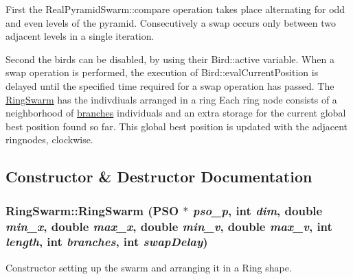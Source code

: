 First the RealPyramidSwarm::compare operation takes place alternating for odd and even levels of the pyramid. Consecutively a swap occurs only between two adjacent levels in a single iteration.\par
 Second the birds can be disabled, by using their Bird::active variable. When a swap operation is performed, the execution of Bird::evalCurrentPosition is delayed until the specified time required for a swap operation has passed. The \hyperlink{classRingSwarm}{RingSwarm} has the indivdiuals arranged in a ring Each ring node consists of a neighborhood of \hyperlink{classRingSwarm_f187d6157f05bba9d56617e47afcd11c}{branches} individuals and an extra storage for the current global best position found so far. This global best position is updated with the adjacent ringnodes, clockwise. 

\subsection{Constructor \& Destructor Documentation}
\hypertarget{classRingSwarm_61b676fb64dbfd3888d0f1b714a9c188}{
\subsubsection{\setlength{\rightskip}{0pt plus 5cm}RingSwarm::RingSwarm ({\bf PSO} $\ast$ {\em pso\_\-p}, \/  int {\em dim}, \/  double {\em min\_\-x}, \/  double {\em max\_\-x}, \/  double {\em min\_\-v}, \/  double {\em max\_\-v}, \/  int {\em length}, \/  int {\em branches}, \/  int {\em swapDelay})}}
\label{classRingSwarm_61b676fb64dbfd3888d0f1b714a9c188}


Constructor setting up the swarm and arranging it in a Ring shape. 

